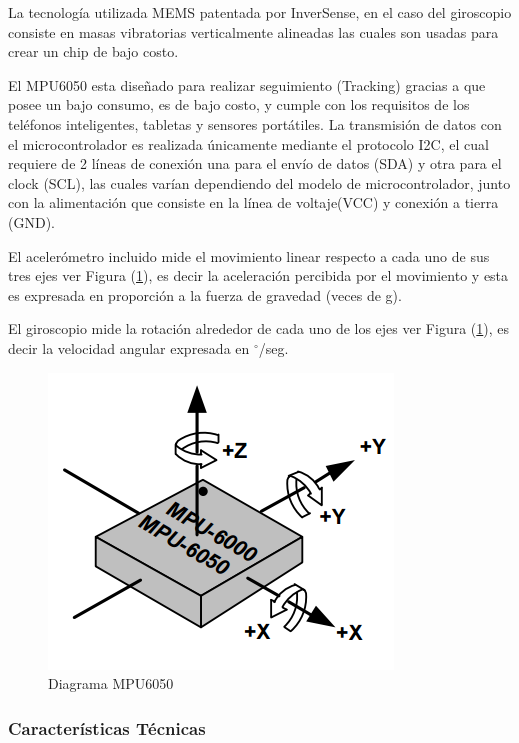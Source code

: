 \documentclass[12pt,a4paper]{article}
\newcommand{\grad}{$^{\circ}$}
\begin{document}
La tecnología utilizada MEMS patentada por InverSense, en el caso del giroscopio consiste en masas vibratorias verticalmente alineadas las cuales son usadas para crear un chip de bajo costo.

El MPU6050 esta diseñado para realizar seguimiento (Tracking) gracias a que posee un bajo consumo, es de bajo costo, y cumple con los requisitos de los teléfonos inteligentes, tabletas y sensores portátiles.
La transmisión de datos con el microcontrolador es realizada únicamente mediante el protocolo I2C, el cual requiere de 2 líneas de conexión una para el envío de datos (SDA) y otra para el clock (SCL), las cuales varían dependiendo del modelo de microcontrolador, junto con la alimentación que consiste en la línea de voltaje(VCC) y conexión a tierra (GND).

El acelerómetro incluido mide el movimiento linear respecto a cada uno de sus tres ejes ver Figura (\ref{fig:MPU6050}), es decir la aceleración percibida por el movimiento y esta es expresada en proporción a la fuerza de gravedad (veces de g).

El giroscopio mide la rotación alrededor de cada uno de los ejes ver Figura (\ref{fig:MPU6050}), es decir la velocidad angular expresada en \grad/seg.

\begin{figure}[H]
	\centering
	\includegraphics[scale=0.5]{images/MPU6050}
	\caption{Diagrama MPU6050}
	\label{fig:MPU6050}
\end{figure}

\subsubsection{Características Técnicas}
\end{document}
